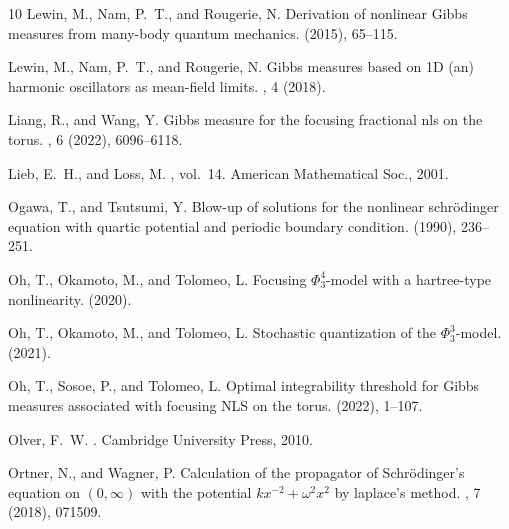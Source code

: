 \documentclass[%
11pt,  reqno]{amsart}
\theoremstyle{remarkstyle}
\newcommand{\1}{\hspace{0.2mm}\text{I}\hspace{0.2mm}}
\numberwithin{equation}{section}
\numberwithin{theorem}{section}
\begin{document}
\begin{thebibliography}{10}
		{\sc Lewin, M., Nam, P.~T., and Rougerie, N.}
		\newblock Derivation of nonlinear {G}ibbs measures from many-body quantum
		mechanics.
		(2015), 65--115.
		
		{\sc Lewin, M., Nam, P.~T., and Rougerie, N.}
		\newblock Gibbs measures based on {1D} (an) harmonic oscillators as mean-field
		limits.
		, 4 (2018).
		
		{\sc Liang, R., and Wang, Y.}
		\newblock Gibbs measure for the focusing fractional nls on the torus.
		, 6 (2022), 6096--6118.
		
		{\sc Lieb, E.~H., and Loss, M.}
		, vol.~14.
		\newblock American Mathematical Soc., 2001.
		
		{\sc Ogawa, T., and Tsutsumi, Y.}
		\newblock Blow-up of solutions for the nonlinear schrödinger equation with
		quartic potential and periodic boundary condition.
		 (1990),
		236--251.
		
		{\sc Oh, T., Okamoto, M., and Tolomeo, L.}
		\newblock Focusing ${\Phi}^4_3$-model with a hartree-type nonlinearity.
		 (2020).
		
		{\sc Oh, T., Okamoto, M., and Tolomeo, L.}
		\newblock Stochastic quantization of the ${\Phi}^3_3$-model.
		 (2021).
		
		{\sc Oh, T., Sosoe, P., and Tolomeo, L.}
		\newblock Optimal integrability threshold for {G}ibbs measures associated with
		focusing {NLS} on the torus.
		 (2022), 1--107.
		
		{\sc Olver, F.~W.}
		.
		\newblock Cambridge University Press, 2010.
		
		{\sc Ortner, N., and Wagner, P.}
		\newblock Calculation of the propagator of {S}chr{\"o}dinger's equation on
		$(0,\infty)$ with the potential $kx^{-2}+ \omega^2 x^2$ by laplace's method.
		, 7 (2018), 071509.
		

\end{thebibliography}
\end{document}
